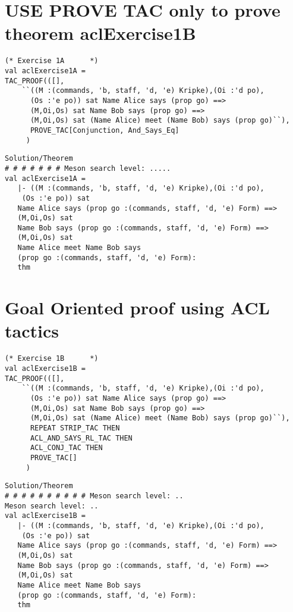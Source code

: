\documentclass{report}
\begin{document}
\section{USE PROVE TAC only to prove theorem aclExercise1B}
\label{prove-13-10-1-B}
\begin{lstlisting}[frame=TBlr]
(* Exercise 1A		*)
val aclExercise1A =
TAC_PROOF(([],
	``((M :(commands, 'b, staff, 'd, 'e) Kripke),(Oi :'d po),
	  (Os :'e po)) sat Name Alice says (prop go) ==>
  	  (M,Oi,Os) sat Name Bob says (prop go) ==>
  	  (M,Oi,Os) sat (Name Alice) meet (Name Bob) says (prop go)``),
	  PROVE_TAC[Conjunction, And_Says_Eq]
	 )
\end{lstlisting}

\begin{session}
  \begin{scriptsize}
\begin{verbatim}
Solution/Theorem
# # # # # # # Meson search level: .....
val aclExercise1A =
   |- ((M :(commands, 'b, staff, 'd, 'e) Kripke),(Oi :'d po),
    (Os :'e po)) sat
   Name Alice says (prop go :(commands, staff, 'd, 'e) Form) ==>
   (M,Oi,Os) sat
   Name Bob says (prop go :(commands, staff, 'd, 'e) Form) ==>
   (M,Oi,Os) sat
   Name Alice meet Name Bob says
   (prop go :(commands, staff, 'd, 'e) Form):
   thm
\end{verbatim}
  \end{scriptsize}
\end{session}

\section{Goal Oriented proof using ACL tactics}
\label{goal-13-10-1-C}
\begin{lstlisting}[frame=TBlr]
(* Exercise 1B		*)
val aclExercise1B = 
TAC_PROOF(([],
	``((M :(commands, 'b, staff, 'd, 'e) Kripke),(Oi :'d po),
	  (Os :'e po)) sat Name Alice says (prop go) ==>
  	  (M,Oi,Os) sat Name Bob says (prop go) ==>
  	  (M,Oi,Os) sat (Name Alice) meet (Name Bob) says (prop go)``),
	  REPEAT STRIP_TAC THEN
	  ACL_AND_SAYS_RL_TAC THEN
	  ACL_CONJ_TAC THEN
	  PROVE_TAC[]
	 )
\end{lstlisting}

\begin{session}
  \begin{scriptsize}
\begin{verbatim}
Solution/Theorem
# # # # # # # # # # Meson search level: ..
Meson search level: ..
val aclExercise1B =
   |- ((M :(commands, 'b, staff, 'd, 'e) Kripke),(Oi :'d po),
    (Os :'e po)) sat
   Name Alice says (prop go :(commands, staff, 'd, 'e) Form) ==>
   (M,Oi,Os) sat
   Name Bob says (prop go :(commands, staff, 'd, 'e) Form) ==>
   (M,Oi,Os) sat
   Name Alice meet Name Bob says
   (prop go :(commands, staff, 'd, 'e) Form):
   thm
\end{verbatim}
  \end{scriptsize}
\end{session}
\end{document}
